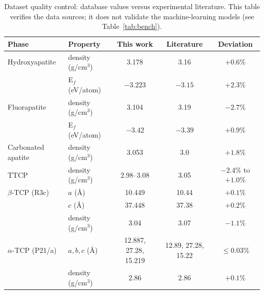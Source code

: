 \documentclass[review,11pt,a4paper]{elsarticle}
\begin{document}
\begin{table}[ht]
\centering\small
\caption{Dataset quality control: database values versus experimental literature. This table verifies the data sources; it does not validate the machine-learning models (see Table~\ref{tab:bench}).}
\label{tab:val}
\begin{tabular}{llccc}
\toprule
Phase & Property & This work & Literature & Deviation \\
\midrule
Hydroxyapatite & density (g/cm$^3$) & 3.178 & 3.16 & $+0.6$\% \\
 & E$_f$ (eV/atom) & $-3.223$ & $-3.15$ & $+2.3$\% \\
Fluorapatite & density (g/cm$^3$) & 3.104 & 3.19 & $-2.7$\% \\
 & E$_f$ (eV/atom) & $-3.42$ & $-3.39$ & $+0.9$\% \\
Carbonated apatite & density (g/cm$^3$) & 3.053 & 3.0 & $+1.8$\% \\
TTCP & density (g/cm$^3$) & 2.98--3.08 & 3.05 & $-2.4$\% to $+1.0$\% \\
$\beta$-TCP (R3c) & $a$ (\AA) & 10.449 & 10.44 & $+0.1$\% \\
 & $c$ (\AA) & 37.448 & 37.38 & $+0.2$\% \\
 & density (g/cm$^3$) & 3.04 & 3.07 & $-1.1$\% \\
$\alpha$-TCP (P21/a) & $a, b, c$ (\AA) & 12.887, 27.28, 15.219 & 12.89, 27.28, 15.22 & $\leq 0.03$\% \\
 & density (g/cm$^3$) & 2.86 & 2.86 & $+0.1$\% \\
\bottomrule
\end{tabular}
\end{table}
\end{document}
